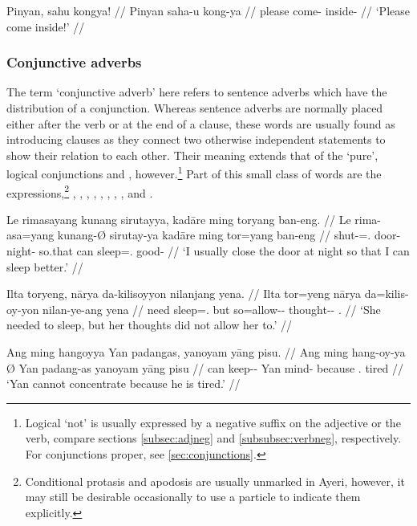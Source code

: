 \ex
\begingl
	\gla Pinyan, sahu kongya! //
	\glb Pinyan saha-u kong-ya //
	\glc please come-\Imp{} inside-\Loc{} //
	\glft `Please come inside!' //
\endgl
\xe

\subsubsection{Conjunctive adverbs}
\label{subsubsec:conjadv}

The term `conjunctive adverb' here refers to sentence adverbs which have the
distribution of a conjunction. Whereas sentence adverbs are normally placed
either after the verb or at the end of a clause, these words are usually found
as introducing clauses as they connect two otherwise independent statements to
show their relation to each other. Their meaning extends that of the `pure',
logical conjunctions  and ,
however.\footnote{Logical `not' is usually expressed by a negative suffix on
the adjective or the verb, compare sections \ref{subsec:adjneg} and
\ref{subsubsec:verbneg}, respectively. For conjunctions proper, see 
\autoref{sec:conjunctions}.} Part of this small class of words are the 
expressions,\footnote{Conditional protasis and 
apodosis are usually unmarked in Ayeri, however, it may still be desirable 
occasionally to use a particle to indicate them explicitly.}
,
,
,
,
,
,
,
, and 
.

\pex
\a\begingl
	\gla Le rimasayang kunang sirutayya, kadāre ming toryang ban-eng. //
	\glb Le rima-asa=yang kunang-Ø sirutay-ya kadāre ming tor=yang 
		ban-eng //
	\glc \PatTI{} shut-\Hab{}=\Fsg{}.\Aarg{} door-\Top{} night-\Loc{} 
		so.that can sleep=\Fsg{}.\Aarg{} good-\Comp{} //
	\glft `I usually close the door at night so that I can sleep better.' //
\endgl

\a\label{ex:but}\begingl
	\gla Ilta toryeng, nārya da-kilisoyyon nilanjang yena. //
	\glb Ilta tor=yeng nārya da=kilis-oy-yon nilan-ye-ang yena //
	\glc need sleep=\TsgF{}.\Aarg{} but so=allow-\Neg{}-\TplN{} 
		thought-\Pl{}-\Aarg{} \TsgF{}.\Gen{} //
	\glft `She needed to sleep, but her thoughts did not allow her to.' //
\endgl

\a\begingl
	\gla Ang ming hangoyya {} Yan padangas, yanoyam yāng pisu. //
	\glb Ang ming hang-oy-ya Ø Yan padang-as yanoyam yāng pisu //
	\glc \AgtT{} can keep-\Neg{}-\TsgM{} \Top{} Yan mind-\Parg{} because 
		\TsgM{}.\Aarg{} tired //
	\glft `Yan cannot concentrate because he is tired.' //
\endgl

